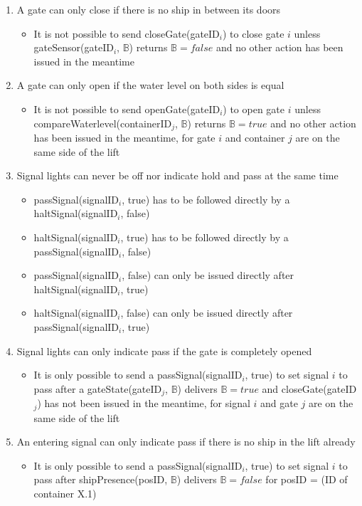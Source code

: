 \begin{enumerate}
	\item A gate can only close if there is no ship in between its doors
	\begin{itemize}
		\item It is not possible to send closeGate(gateID$_i$) to close gate $i$ unless gateSensor(gateID$_i$, $\mathbb{B}$) returns $\mathbb{B} = false$ and no other action has been issued in the meantime
	\end{itemize}
	
	\item A gate can only open if the water level on both sides is equal
	\begin{itemize}
		\item It is not possible to send openGate(gateID$_i$) to open gate $i$ unless compareWaterlevel(containerID$_j$, $\mathbb{B}$) returns $\mathbb{B} = true$ and no other action has been issued in the meantime, for gate $i$ and container $j$ are on the same side of the lift
	\end{itemize}
	
	\item Signal lights can never be off nor indicate hold and pass at the same time
		\begin{itemize}
			\item passSignal(signalID$_i$, true) has to be followed directly by a haltSignal(signalID$_i$, false)
			\item haltSignal(signalID$_i$, true) has to be followed directly by a passSignal(signalID$_i$, false)
			\item passSignal(signalID$_i$, false) can only be issued directly after haltSignal(signalID$_i$, true)
			\item haltSignal(signalID$_i$, false) can only be issued directly after passSignal(signalID$_i$, true)
		\end{itemize}
	\item Signal lights can only indicate pass if the gate is completely opened
		\begin{itemize}
			\item It is only possible to send a passSignal(signalID$_i$, true) to set signal $i$ to pass after a gateState(gateID$_j$, $ \mathbb{B} $) delivers $\mathbb{B} = true$ and closeGate(gateID$_j$) has not been issued in the meantime, for signal $i$ and gate $j$ are on the same side of the lift
		\end{itemize}
	\item An entering signal can only indicate pass if there is no ship in the lift already
		\begin{itemize}
			\item It is only possible to send a passSignal(signalID$_i$, true) to set signal $i$ to pass after shipPresence(posID, $\mathbb{B}$) delivers $\mathbb{B} = false$ for posID = (ID of container X.1)
		\end{itemize}
\end{enumerate}

